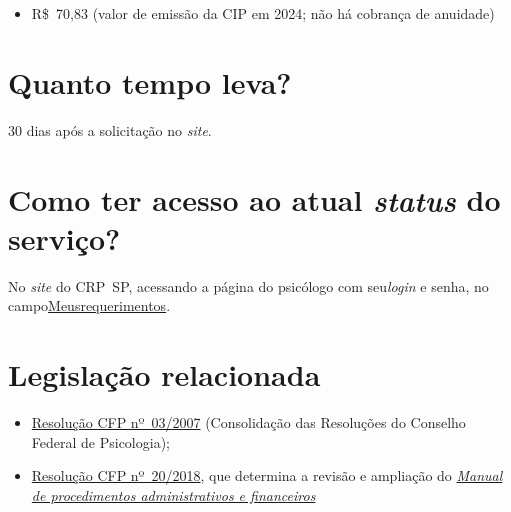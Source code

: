 \begin{itemize}
  \item  R\$~70,83 (valor de emissão da CIP em 2024; não há cobrança de  anuidade)
\end{itemize}

\section{Quanto tempo leva?}

30 dias após a solicitação no \emph{site}.

\section{Como ter acesso ao atual \emph{status} do serviço?}

No \emph{site} do CRP~SP, acessando a página do psicólogo com seu\emph{login} e senha, no campo\href{https://cfpsp.brctotal.com/crp06_servicosonline/pgsRequerimento/MeusRequerimentos.aspx}{Meusrequerimentos}.

\section{Legislação relacionada}

\begin{itemize}
  \item  \href{https://atosoficiais.com.br/cfp/resolucao-administrativa-financeira-n-3-2007-institui-a-consolidacao-das-resolucoes-do-conselho-federal-de-psicologia?origin=instituicao&q=resolu\%C3\%A7\%C3\%A3o\%203/2007}{Resolução  CFP nº~03/2007} (Consolidação das Resoluções do Conselho Federal de  Psicologia);
  \item  \href{https://transparencia.cfp.org.br/wp-content/uploads/sites/7/2020/05/Manual-de-Procedimentos-Administrativos-e-Financeiro-CFP-RES-20.2018.pdf}{\href{https://atosoficiais.com.br/cfp/resolucao-administrativa-financeira-n-20-2018-altera-o-manual-de-procedimentos-administrativo-e-financeiro-do-sistema-conselhos-de-psicologia-anexo-da-resolucao-cfp-n-202018-a-resolucao-cfp-n-03-2007-a-resolucao-cfp-n-16-2019-e-da-outras-providencias}{Resolução  CFP nº~20/2018}}, que determina a revisão e ampliação do  \href{https://transparencia.cfp.org.br/wp-content/uploads/sites/7/2020/05/Manual-de-Procedimentos-Administrativos-e-Financeiro-CFP-RES-20.2018.pdf}{\emph{Manual  de procedimentos administrativos e financeiros}}
\end{itemize}

